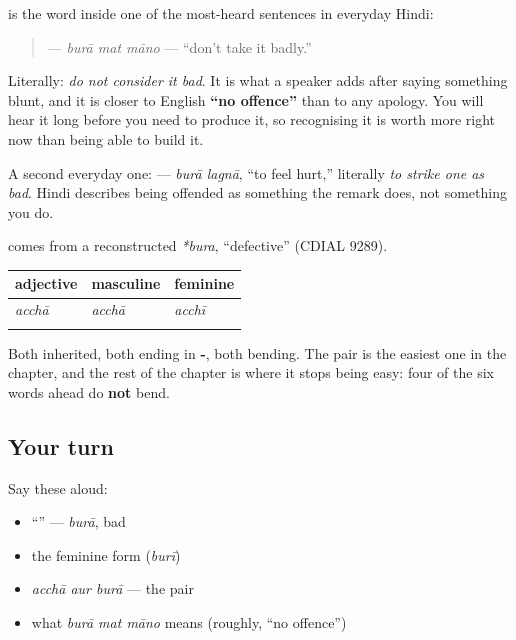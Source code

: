\begin{cousinweb}
\textbf{} is the word inside one of the most-heard sentences in everyday Hindi:

\begin{quote}
\textbf{  } — \emph{burā mat māno} — \textquotedblleft{}don't take it badly.\textquotedblright{}
\end{quote}

Literally: \emph{do not consider it bad}. It is what a speaker adds after saying something blunt, and it is closer to English \textbf{\textquotedblleft{}no offence\textquotedblright{}} than to any apology. You will hear it long before you need to produce it, so recognising it is worth more right now than being able to build it.

A second everyday one: \textbf{ } — \emph{burā lagnā}, \textquotedblleft{}to feel hurt,\textquotedblright{} literally \emph{to strike one as bad}. Hindi describes being offended as something the remark does, not something you do.

\textbf{} comes from a reconstructed \emph{*bura}, \textquotedblleft{}defective\textquotedblright{} (CDIAL 9289).
\end{cousinweb}

\begin{grammarlens}[title={Grammar Lens: a pair that behaves identically}]
\noindent
\begin{tabularx}{\linewidth}{@{}>{\raggedright\arraybackslash}X>{\raggedright\arraybackslash}X>{\raggedright\arraybackslash}X@{}}
\toprule
\textbf{adjective} & \textbf{masculine} & \textbf{feminine} \\
\midrule
\emph{acchā} & \emph{acchā} & \emph{acchī} \\
\hi{बुरा} & \hi{बुरा} & \hi{बुरी} \\
\bottomrule
\end{tabularx}

Both inherited, both ending in \textbf{-}, both bending. The pair is the easiest one in the chapter, and the rest of the chapter is where it stops being easy: four of the six words ahead do \textbf{not} bend.
\end{grammarlens}

\subsection*{Your turn}
Say these aloud:

\begin{itemize}
\raggedright
  \item \textquotedblleft{}\textquotedblright{} — \emph{burā}, bad
  \item the feminine form (\emph{burī})
  \item \emph{acchā aur burā} — the pair
  \item what \emph{burā mat māno} means (roughly, \textquotedblleft{}no offence\textquotedblright{})
\end{itemize}

